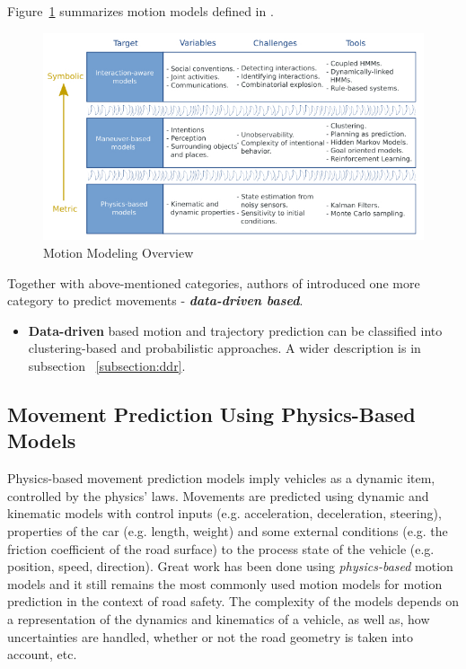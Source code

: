 Figure~\ref{fig:MotModOv} summarizes motion models defined in \cite{ClassificationI}.

\begin{figure}[h]
	\centering  	
	\includegraphics[width=15cm]{img/2.jpg}
	\caption{Motion Modeling Overview \cite{ClassificationI}}
	\label{fig:MotModOv}    
\end{figure}

Together with above-mentioned categories, authors of \cite{ClassificationII} introduced one more category to predict movements - \textbf{\textit{data-driven based}}.

\begin{itemize}
	\item \textbf{Data-driven} based motion and trajectory prediction can be classified into clustering-based and probabilistic approaches. A wider description is in subsection ~\ref{subsection:ddr}.
\end{itemize}

\subsection{Movement Prediction Using Physics-Based Models}
\label{subsection:phb}

Physics-based movement prediction models imply vehicles as a dynamic item, controlled by the physics' laws. Movements are predicted using dynamic and kinematic models with control inputs (e.g. acceleration, deceleration, steering), properties of the car (e.g. length, weight) and some external conditions (e.g. the friction coefficient of the road surface) to the process state of the vehicle (e.g. position, speed, direction). Great work has been done using \textit{physics-based} motion models and it still remains the most commonly used motion models for motion prediction in the context of road safety. The complexity of the models depends on a representation of the dynamics and kinematics of a vehicle, as well as, how uncertainties are handled, whether or not the road geometry is taken into account, etc. \\

